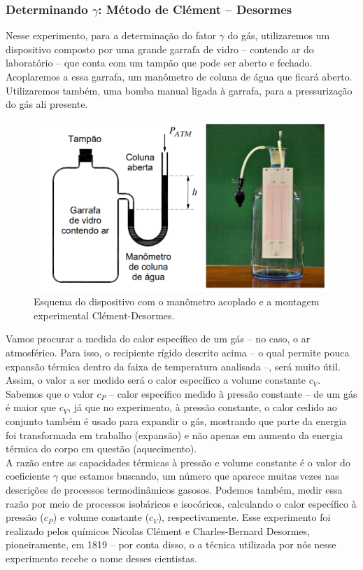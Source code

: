 \subsubsection{Determinando $\gamma$: Método de Clément – Desormes}

Nesse experimento, para a determinação do fator $\gamma$ do gás, utilizaremos um dispositivo composto por uma grande garrafa de vidro – contendo ar do laboratório – que conta com um tampão que pode ser aberto e fechado. Acoplaremos a essa garrafa, um manômetro de coluna de água que ficará aberto. Utilizaremos também, uma bomba manual ligada à garrafa, para a pressurização do gás ali presente.

\begin{figure}[H]
  \centering
  \includegraphics[scale=0.67]{images/Método Clément-Desormes.png}
  \caption{Esquema do dispositivo com o manômetro acoplado e a montagem experimental Clément-Desormes.}
\end{figure}

Vamos procurar a medida do calor específico de um gás – no caso, o ar atmosférico. Para isso, o recipiente rígido descrito acima – o qual permite pouca expansão térmica dentro da faixa de temperatura analisada –, será muito útil. Assim, o valor a ser medido será o calor específico a volume constante $c_V$. Sabemos que o valor $c_P$ – calor específico medido à pressão constante – de um gás é maior que $c_V$, já que no experimento, à pressão constante, o calor cedido ao conjunto também é usado para expandir o gás, mostrando que parte da energia foi transformada em trabalho (expansão) e não apenas em aumento da energia térmica do corpo em questão (aquecimento).\\

A razão entre as capacidades térmicas à pressão e volume constante é o valor do coeficiente $\gamma$ que estamos buscando, um número que aparece muitas vezes nas descrições de processos termodinâmicos gasosos. Podemos também, medir essa razão por meio de processos isobáricos e isocóricos, calculando o calor específico à pressão ($c_P$) e volume constante ($c_V$), respectivamente. Esse experimento foi realizado pelos químicos Nicolas Clément e Charles-Bernard Desormes, pioneiramente, em 1819 – por conta disso, o a técnica utilizada por nós nesse experimento recebe o nome desses cientistas. \\

